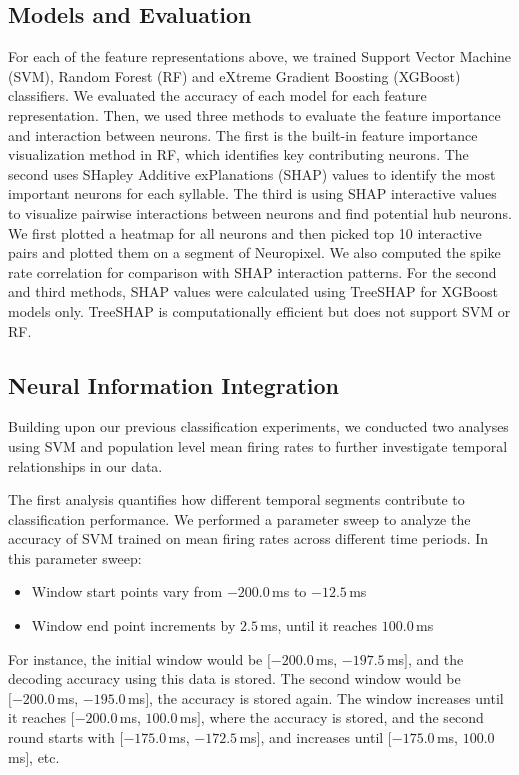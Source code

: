 \documentclass[../CLthesis.tex]{subfiles}
\begin{document}
\subsection{Models and Evaluation}
For each of the feature representations above, we trained Support Vector Machine (SVM), Random Forest (RF) and eXtreme Gradient Boosting (XGBoost) classifiers. We evaluated the accuracy of each model for each feature representation. Then, we used three methods to evaluate the feature importance and interaction between neurons. The first is the built-in feature importance visualization method in RF, which identifies key contributing neurons. The second uses SHapley Additive exPlanations (SHAP) \citep{Lundberg2017-oo} values to identify the most important neurons for each syllable. The third is using SHAP interactive values to visualize pairwise interactions between neurons and find potential hub neurons. We first plotted a heatmap for all neurons and then picked top 10 interactive pairs and plotted them on a segment of Neuropixel. We also computed the spike rate correlation for comparison with SHAP interaction patterns. For the second and third methods, SHAP values were calculated using TreeSHAP for XGBoost models only. TreeSHAP is computationally efficient but does not support SVM or RF.

\subsection{Neural Information Integration}
Building upon our previous classification experiments, we conducted two analyses using SVM and population level mean firing rates to further investigate temporal relationships in our data.  

The first analysis quantifies how different temporal segments contribute to classification performance. We performed a parameter sweep to analyze the accuracy of SVM trained on mean firing rates across different time periods. In this parameter sweep:
\begin{itemize}
    \item Window start points vary from $-200.0$\,ms to $-12.5$\,ms
    \item Window end point increments by $2.5$\,ms, until it reaches $100.0$\,ms
\end{itemize}
For instance, the initial window would be $[-200.0$\,ms, $-197.5$\,ms$]$, and the decoding accuracy using this data is stored. The second window would be $[-200.0$\,ms, $-195.0$\,ms$]$, the accuracy is stored again. The window increases until it reaches $[-200.0$\,ms, $100.0$\,ms$]$, where the accuracy is stored, and the second round starts with $[-175.0$\,ms, $-172.5$\,ms$]$, and increases until $[-175.0$\,ms, $100.0$\,ms$]$, etc.
\end{document}
